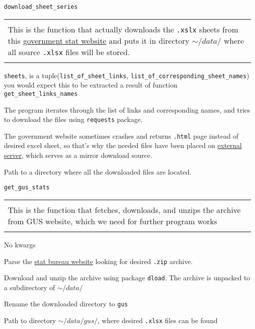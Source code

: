 \documentclass[12pt,a4paper]{article}
\newcommand{\code}[1]{\texttt{#1}}
\newenvironment{func}[1]
    {\begin{center}
    #1\\[1ex]
    \begin{tabular}{|p{0.9\textwidth}|}
    \hline\\
    }
    {
    \\\\\hline
    \end{tabular}
    \end{center}
    }
\begin{document}
\begin{func}{\texttt{download\_sheet\_series}}
This is the function that actually downloads the \code{.xslx} sheets from this \href{https://www.gov.pl/web/finanse/udzialy-za-2020-r}{government stat website} and puts it in directory $\sim/data/$ where all source \code{.xlsx} files will be stored.
\end{func}

\begin{details}{
\item \code{sheets}, is a tuple(\code{list\_of\_sheet\_links}, \code{list\_of\_corresponding\_sheet\_names}) you would expect this to be extracted a result of function \texttt{get\_sheet\_links\_names}
}{
\item The program iterates through the list of links and corresponding names, and tries to download the files using \code{requests} package.
\item The government website sometimes crashes and returns \code{.html} page instead of desired excel sheet, so that's why the needed files have been placed on \href{http://studenci.fuw.edu.pl/~kc427902/NPD_xlsx_mirror/}{external server}, which serves as a mirror download source.
}{
\item Path to a directory where all the downloaded files are located.
}
\end{details}

\begin{func}{\texttt{get\_gus\_stats}}
This is the function that fetches, downloads, and unzips the archive from GUS website, which we need for further program works
\end{func}

\begin{details}{
\item No kwargs
}{
\item Parse the \href{https://stat.gov.pl/obszary-tematyczne/ludnosc/ludnosc/ludnosc-stan-i-struktura-ludnosci-oraz-ruch-naturalny-w-przekroju-terytorialnym-stan-w-dniu-31-12-2020,6,29.html}{stat bureau website} looking for desired \code{.zip} archive.
\item Download and unzip the archive using package \code{dload}. The archive is unpacked to a subdirectory of $\sim/data/$
\item Rename the downloaded directory to \code{gus}
}{
\item Path to directory $\sim/data/gus/$, where desired \code{.xlsx} files can be found
}
\end{details}
\end{document}
